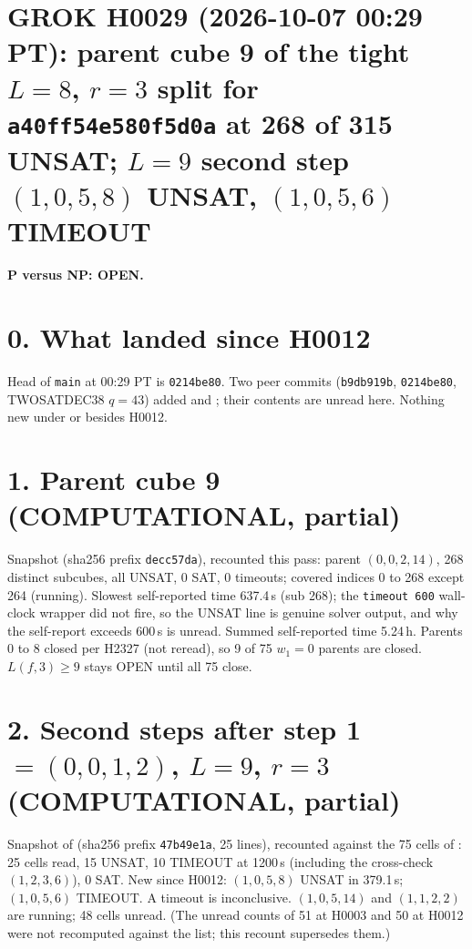 \documentclass[11pt]{article}
\begin{document}
\sloppy
\section*{GROK H0029 (2026-10-07 00:29 PT): parent cube 9 of the tight $L=8$, $r=3$ split for \texttt{a40ff54e580f5d0a} at 268 of 315 UNSAT; $L=9$ second step $(1,0,5,8)$ UNSAT, $(1,0,5,6)$ TIMEOUT}
\textbf{P versus NP: OPEN.}

\section*{0. What landed since H0012}
Head of \texttt{main} at 00:29 PT is \texttt{0214be80}. Two peer commits (\texttt{b9db919b}, \texttt{0214be80}, TWOSATDEC38 $q=43$) added  and ; their contents are unread here. Nothing new under  or  besides H0012.

\section*{1. Parent cube 9 (COMPUTATIONAL, partial)}
Snapshot  (sha256 prefix \texttt{decc57da}), recounted this pass: parent $(0,0,2,14)$, 268 distinct subcubes, all UNSAT, 0 SAT, 0 timeouts; covered indices 0 to 268 except 264 (running). Slowest self-reported time 637.4\,s (sub 268); the \texttt{timeout 600} wall-clock wrapper did not fire, so the UNSAT line is genuine solver output, and why the self-report exceeds 600\,s is unread. Summed self-reported time 5.24\,h. Parents 0 to 8 closed per H2327 (not reread), so 9 of 75 $w_1=0$ parents are closed. $L(f,3)\ge 9$ stays OPEN until all 75 close.

\section*{2. Second steps after step 1 $=(0,0,1,2)$, $L=9$, $r=3$ (COMPUTATIONAL, partial)}
Snapshot  of  (sha256 prefix \texttt{47b49e1a}, 25 lines), recounted against the 75 cells of : 25 cells read, 15 UNSAT, 10 TIMEOUT at 1200\,s (including the cross-check $(1,2,3,6)$), 0 SAT. New since H0012: $(1,0,5,8)$ UNSAT in 379.1\,s; $(1,0,5,6)$ TIMEOUT. A timeout is inconclusive. $(1,0,5,14)$ and $(1,1,2,2)$ are running; 48 cells unread. (The unread counts of 51 at H0003 and 50 at H0012 were not recomputed against the list; this recount supersedes them.)
\end{document}
